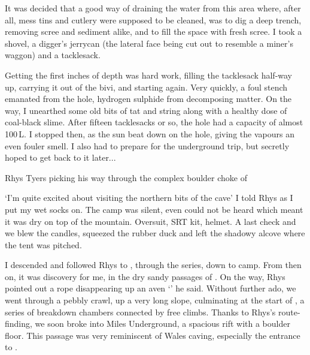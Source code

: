 It was decided that a good way of draining the water from this area where, after all, mess tins and cutlery were supposed to be cleaned, was to dig a deep trench, removing scree and sediment alike, and to fill the space with fresh scree. I took a shovel, a digger's jerrycan (the lateral face being cut out to resemble a miner's waggon) and a tacklesack. 

Getting the first inches of depth was hard work, filling the tacklesack half-way up, carrying it out of the bivi, and starting again. Very quickly, a foul stench emanated from the hole, hydrogen sulphide from decomposing matter. On the way, I unearthed some old bits of tat and string along with a healthy dose of coal-black slime. After fifteen tacklesacks or so, the hole had a capacity of almost 100\,L. I stopped then, as the sun beat down on the hole, giving the vapours an even fouler smell. I also had to prepare for the underground trip, but secretly hoped to get back to it later...

 \begin{marginfigure}
\checkoddpage \ifoddpage \forcerectofloat \else \forceversofloat \fi
\centering
 \caption{Rhys Tyers picking his way through the complex boulder choke of \protect{} }
 \label{smash}
\end{marginfigure}

`I'm quite excited about visiting the northern bits of the cave' I told Rhys as I put my wet socks on. The camp was silent, even  could not be heard which meant it was dry on top of the mountain. Oversuit, SRT kit, helmet. A last check and we blew the candles, squeezed the rubber duck and left the shadowy alcove where the tent was pitched.

I descended  and followed Rhys to , through the  series, down  to  camp. From then on, it was discovery for me, in the dry sandy passages of . On the way, Rhys pointed out a rope disappearing up an aven `' he said. Without further ado, we went through a pebbly crawl, up a very long slope, culminating at the start of , a series of breakdown chambers connected by free climbs. Thanks to Rhys's route-finding, we soon broke into Miles Underground, a spacious rift with a boulder floor. This passage was very reminiscent of Wales caving, especially the entrance to .

